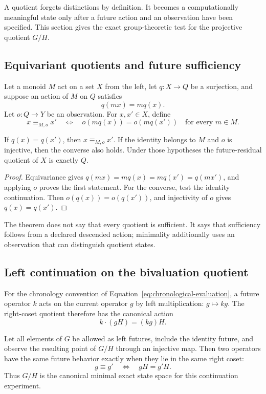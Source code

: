 A quotient forgets distinctions by definition.  It becomes a computationally
meaningful state only after a future action and an observation have been
specified.  This section gives the exact group-theoretic test for the
projective quotient $G/H$.

\subsection{Equivariant quotients and future sufficiency}

Let a monoid $M$ act on a set $X$ from the left, let $q:X\to Q$ be a
surjection, and suppose an action of $M$ on $Q$ satisfies
\[
  q(mx)=m q(x).
\]
Let $o:Q\to Y$ be an observation.  For $x,x'\in X$, define
\[
  x\equiv_{M,o}x'
  \quad\Longleftrightarrow\quad
  o(mq(x))=o(mq(x'))\quad\text{for every }m\in M.
\]

\begin{theorem}
\label{thm:equivariant-quotient-residual}
If $q(x)=q(x')$, then $x\equiv_{M,o}x'$.  If the identity belongs to $M$ and
$o$ is injective, then the converse also holds.  Under those hypotheses the
future-residual quotient of $X$ is exactly $Q$.
\end{theorem}

\begin{proof}
Equivariance gives $q(mx)=mq(x)=mq(x')=q(mx')$, and applying $o$ proves the
first statement.  For the converse, test the identity continuation.  Then
$o(q(x))=o(q(x'))$, and injectivity of $o$ gives $q(x)=q(x')$.
\end{proof}

The theorem does not say that every quotient is sufficient.  It says that
sufficiency follows from a declared descended action; minimality additionally
uses an observation that can distinguish quotient states.

\subsection{Left continuation on the bivaluation quotient}

For the chronology convention of Equation~\eqref{eq:chronological-evaluation},
a future operator $k$ acts on the current operator $g$ by left multiplication:
$g\mapsto kg$.  The right-coset quotient therefore has the canonical action
\[
  k\cdot(gH)=(kg)H.
\]

\begin{corollary}
\label{cor:left-continuation-exact}
Let all elements of $G$ be allowed as left futures, include the identity
future, and observe the resulting point of $G/H$ through an injective map.
Then two operators have the same future behavior exactly when they lie in the
same right coset:
\[
  g\equiv g'\quad\Longleftrightarrow\quad gH=g'H.
\]
Thus $G/H$ is the canonical minimal exact state space for this continuation
experiment.
\end{corollary}


